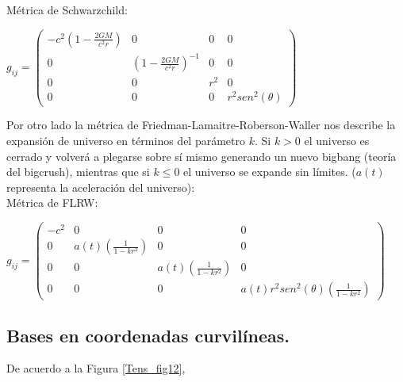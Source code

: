Métrica de Schwarzchild: 

\bigskip

$g_{ij}= \left(\begin{array}{cccc}  -c^2(1- \frac{2GM}{c^2 r}) & 0 & 0& 0 \\ 0 &  (1- \frac{2GM}{c^2 r})^{-1}& 0 & 0 \\   0 & 0 & r^2 &0 \\ 0 & 0 & 0 & r^2sen^2(\theta)

\end{array}
 \right)  \qquad $

 \bigskip

 Por otro lado la métrica de Friedman-Lamaitre-Roberson-Waller nos describe la expansión de universo en términos del parámetro $k$. Si $k>0$ el universo es cerrado y volverá a plegarse sobre sí mismo generando un nuevo bigbang (teoría del bigcrush), mientras que si $k\leq 0$ el universo se expande sin límites. ($a(t)$ representa la aceleración del universo):\\

 Métrica de FLRW: 
 
 \bigskip
 
 $g_{ij}= \left(\begin{array}{cccc}  -c^2 & 0 & 0& 0 \\ 0 &  a(t)(\frac{1}{1-kr^2 })& 0 & 0 \\   0 & 0 & a(t)(\frac{1}{1-kr^2 }) &0 \\ 0 & 0 & 0 & a(t)r^2sen^2(\theta)(\frac{1}{1-kr^2 })

\end{array}
\right)  \qquad $






\subsection{Bases en coordenadas curvilíneas.}
\bigskip




\bigskip

De acuerdo a la Figura \ref{Tens_fig12},

